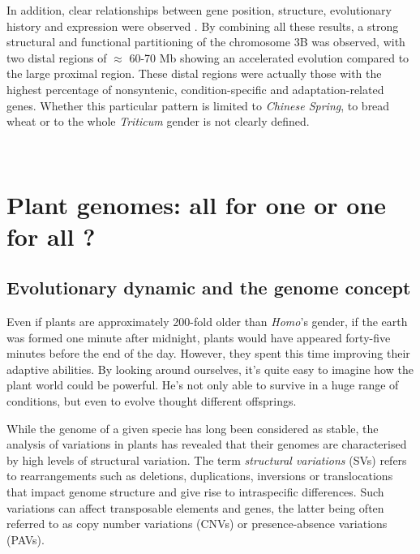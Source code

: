 \documentclass[a4paper, 12pt]{article}
\begin{document}
\begin{onehalfspace}
In addition, clear relationships between gene position, structure, evolutionary history and expression were observed \citep{Pingault2015}. By combining all these results, a strong structural and functional partitioning of the chromosome 3B was observed, with two distal regions of $\approx$ 60-70 Mb showing an accelerated evolution compared to the large proximal region. These distal regions were actually those with the highest percentage of nonsyntenic, condition-specific and adaptation-related genes. Whether this particular pattern is limited to \textit{Chinese Spring}, to bread wheat or to the whole \textit{Triticum} gender is not clearly defined.

\newpage %
\thispagestyle{empty}
~
\addtocounter{page}{-1}
\newpage
\clearpage %


    \section{Plant genomes: all for one or one for all ?}

        \subsection{Evolutionary dynamic and the genome concept}
        
Even if plants are approximately 200-fold older than \textit{Homo}'s gender, if the earth was formed one minute after midnight, plants would have appeared forty-five minutes before the end of the day. However, they spent this time improving their adaptive abilities. By looking around ourselves, it's quite easy to imagine how the plant world could be powerful. He's not only able to survive in a huge range of conditions, but even to evolve thought different offsprings.

While the genome of a given specie has long been considered as stable, the analysis of variations in plants has revealed that their genomes are characterised by high levels of structural variation. The term \textit{structural variations} (SVs) refers to rearrangements such as deletions, duplications, inversions or translocations that impact genome structure and give rise to intraspecific differences. Such variations can affect transposable elements and genes, the latter being often referred to as copy number variations (CNVs) or presence-absence variations (PAVs).


\end{onehalfspace}
\end{document}
